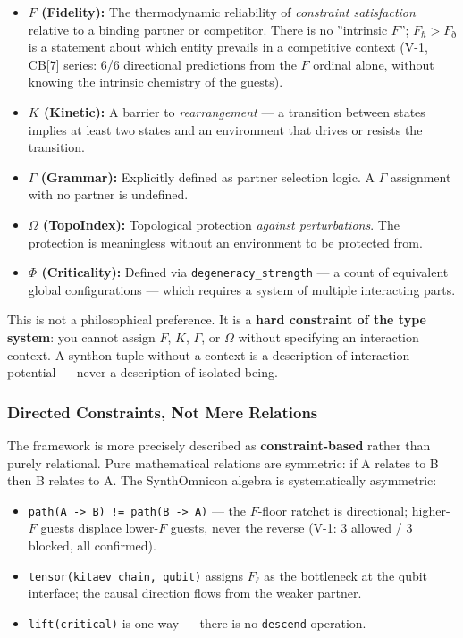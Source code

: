 \documentclass[12pt,a4paper]{article}
\begin{document}
\begin{itemize}
    \item \textbf{$F$ (Fidelity):} The thermodynamic reliability of \emph{constraint satisfaction} relative to a binding partner or competitor. There is no ''intrinsic $F$''; $F_\hbar > F_\eth$ is a statement about which entity prevails in a competitive context (V-1, CB{[}7{]} series: 6/6 directional predictions from the $F$ ordinal alone, without knowing the intrinsic chemistry of the guests).
    \item \textbf{$K$ (Kinetic):} A barrier to \emph{rearrangement} --- a transition between states implies at least two states and an environment that drives or resists the transition.
    \item \textbf{$\Gamma$ (Grammar):} Explicitly defined as partner selection logic. A $\Gamma$ assignment with no partner is undefined.
    \item \textbf{$\Omega$ (TopoIndex):} Topological protection \emph{against perturbations}. The protection is meaningless without an environment to be protected from.
    \item \textbf{$\Phi$ (Criticality):} Defined via \texttt{degeneracy\_strength} --- a count of equivalent global configurations --- which requires a system of multiple interacting parts.
\end{itemize}

This is not a philosophical preference. It is a \textbf{hard constraint of the type system}: you cannot assign $F$, $K$, $\Gamma$, or $\Omega$ without specifying an interaction context. A synthon tuple without a context is a description of interaction potential --- never a description of isolated being.

\subsubsection{Directed Constraints, Not Mere Relations}

The framework is more precisely described as \textbf{constraint-based} rather than purely relational. Pure mathematical relations are symmetric: if A relates to B then B relates to A. The SynthOmnicon algebra is systematically asymmetric:

\begin{itemize}
    \item \texttt{path(A -\textgreater{} B) != path(B -\textgreater{} A)} --- the $F$-floor ratchet is directional; higher-$F$ guests displace lower-$F$ guests, never the reverse (V-1: 3 allowed / 3 blocked, all confirmed).
    \item \texttt{tensor(kitaev\_chain, qubit)} assigns $F_\ell$ as the bottleneck at the qubit interface; the causal direction flows from the weaker partner.
    \item \texttt{lift(critical)} is one-way --- there is no \texttt{descend} operation.
\end{itemize}
\end{document}
